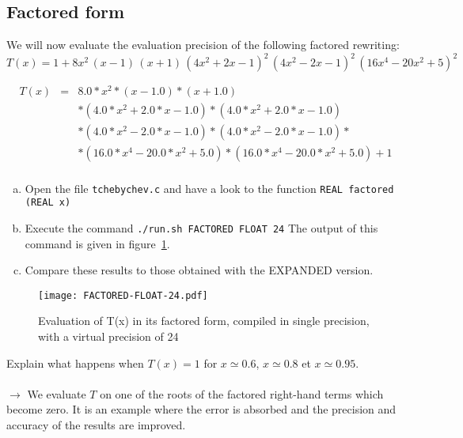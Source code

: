 \subsection{Factored form}

We will now evaluate the evaluation precision of the following factored rewriting:
\[
    T(x) = 1 + 8x^2\,(x-1)\,(x+1)\,(4x^2 + 2x - 1)^2\, (4x^2 - 2x - 1)^2\,(16x^4 - 20x^2 + 5)^2
\]

\begin{eqnarray*}
    T(x) &=& 8.0*x^2*(x - 1.0)*(x + 1.0) \\
    & & * (4.0*x^2 + 2.0*x - 1.0)*(4.0*x^2 + 2.0*x - 1.0) \\
    & & * (4.0*x^2 - 2.0*x - 1.0)*(4.0*x^2 - 2.0*x - 1.0)* \\
    & & * (16.0*x^4 - 20.0*x^2 + 5.0)*(16.0*x^4 - 20.0*x^2 + 5.0) + 1 \\
\end{eqnarray*}

\begin{question}
    \begin{enumerate}[(a)]
        \item Open the file {\tt tchebychev.c} and have a look to the function {\tt REAL factored (REAL x)}
        \item Execute the command {\tt ./run.sh FACTORED FLOAT 24} \newline
              The output of this command is given in figure~\ref{fig:factored:float}.
        \item Compare these results to those obtained with the EXPANDED version.
    \end{enumerate}
\end{question}

\begin{figure}[h]
    \center \texttt{[image: FACTORED-FLOAT-24.pdf]}
    \caption{Evaluation of T(x) in its factored form, compiled in single precision, with a virtual precision of 24}
    \label{fig:factored:float}
\end{figure}

\begin{question}
    Explain what happens when $T(x)=1$ for $x\simeq 0.6$,
    $x\simeq 0.8$ et $x\simeq 0.95$.\\~\\
    $\rightarrow$ We evaluate $T$ on one of the roots of the factored right-hand terms which become zero.
    It is an example where the error is absorbed and the precision and accuracy of the results are improved.
\end{question}


